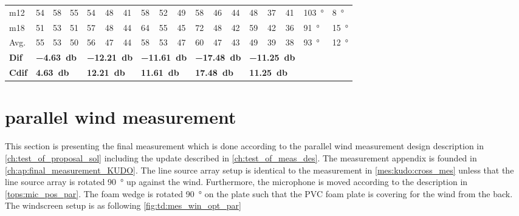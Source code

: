 \begin{table}[H]
\begin{tabular}{l|l|l|l|l|l|l|l|l|l|l|l|l|l|l|l|l|l}
m12  &  54    &   58   &  55    &  54    &   48   &   41   &   58   &  52     &   49   &    58   &   46   &   44   & 48 & 37 & 41  & \SI{103}{\degree} & \SI{8}{\degree} \\
m18  &  51    &   53   &  51    &   57   &  48    &   44   &   64   &   55    &  45    &    72   &  48    &   42   & 59 & 42 & 36  & \SI{91}{\degree} & \SI{15}{\degree} \\ \hline
Avg. &  55    &  53    &  50    &  56    & 47     &  44    &   58   &  53     &  47    &  60     &   47   &  43    & 49 & 39  & 38  & \SI{93}{\degree} & \SI{12}{\degree} \\ \hline  
\textbf{Dif} & \multicolumn{3}{l|}{\textbf{\SI{-4.63}{\decibel}}} & \multicolumn{3}{l|}{\textbf{\SI{-12.21}{\decibel}}} & \multicolumn{3}{l|}{\textbf{\SI{-11.61}{\decibel}}} & \multicolumn{3}{l|}{\textbf{\SI{-17.48}{\decibel}}} & \multicolumn{3}{l|}{\textbf{\SI{-11.25}{\decibel}}}   &  \multicolumn{2}{l}{}    \\  \hline 
\textbf{Cdif} & \multicolumn{3}{l|}{\textbf{\SI{4.63}{\decibel}}} & \multicolumn{3}{l|}{\textbf{\SI{12.21}{\decibel}}} & \multicolumn{3}{l|}{\textbf{\SI{11.61}{\decibel}}} & \multicolumn{3}{l|}{\textbf{\SI{17.48}{\decibel}}} & \multicolumn{3}{l|}{\textbf{\SI{11.25}{\decibel}}}  &   \multicolumn{2}{l}{}                          
\end{tabular}
\label{meas:result_cross_7_8}
\end{table}




\section{parallel wind measurement}\label{mes:kudo:par_mes}
This section is presenting the final measurement which is done according to the parallel wind measurement design description in \autoref{ch:test_of_proposal_sol} including the update described in \autoref{ch:test_of_meas_des}. The measurement appendix is founded in \autoref{ch:ap:final_measurement_KUDO}. The line source array setup is identical to the measurement in \autoref{mes:kudo:cross_mes} unless that the line source array is rotated \SI{90}{\degree} up against the wind. Furthermore, the microphone is moved according to the description in \autoref{tops:mic_pos_par}. The foam wedge is rotated \SI{90}{\degree} on the plate such that the PVC foam plate is covering for the wind from the back. The windscreen setup is as following \autoref{fig:td:mes_win_opt_par}   

